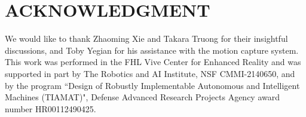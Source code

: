 \documentclass[letterpaper, 10 pt, conference]{ieeeconf}  %
\begin{document}








\section*{ACKNOWLEDGMENT}

We would like to thank Zhaoming Xie and Takara Truong for their insightful discussions, and Toby Yegian for his assistance with the motion capture system. This work was performed in the FHL Vive Center for Enhanced Reality and was supported in part by The Robotics and AI Institute, NSF CMMI-2140650, and by the program ``Design of Robustly Implementable Autonomous and Intelligent Machines (TIAMAT)", Defense Advanced Research Projects Agency award number HR00112490425.




{
\balance


}
\end{document}
